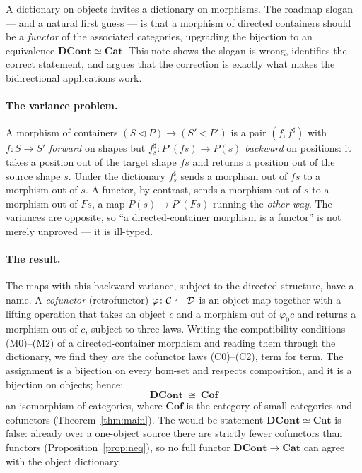 \documentclass[11pt,a4paper]{amsart}
\newcommand{\Cat}{\mathbf{Cat}}
\newcommand{\Cof}{\mathbf{Cof}}
\newcommand{\DCont}{\mathbf{DCont}}
\newcommand{\cont}[2]{#1 \triangleleft #2}
\newcommand{\co}{\mathrel{\text{\reflectbox{$\rightharpoonup$}}}}
\theoremstyle{plain}
\theoremstyle{definition}
\theoremstyle{remark}
\begin{document}
A dictionary on objects invites a dictionary on morphisms. The roadmap slogan --- and a
natural first guess --- is that a morphism of directed containers should be a
\emph{functor} of the associated categories, upgrading the bijection to an equivalence
$\DCont\simeq\Cat$. This note shows the slogan is wrong, identifies the correct
statement, and argues that the correction is exactly what makes the bidirectional
applications work.

\paragraph{The variance problem.} A morphism of containers $(\cont SP)\to(\cont{S'}{P'})$
is a pair $(f,f^\sharp)$ with $f\colon S\to S'$ \emph{forward} on shapes but
$f^\sharp_s\colon P'(fs)\to P(s)$ \emph{backward} on positions: it takes a position out
of the target shape $fs$ and returns a position out of the source shape $s$. Under the
dictionary $f^\sharp_s$ sends a morphism out of $fs$ to a morphism out of $s$. A functor,
by contrast, sends a morphism out of $s$ to a morphism out of $Fs$, a map
$P(s)\to P'(Fs)$ running the \emph{other way}. The variances are opposite, so ``a
directed-container morphism is a functor'' is not merely unproved --- it is ill-typed.

\paragraph{The result.} The maps with this backward variance, subject to the directed
structure, have a name. A \emph{cofunctor} (retrofunctor) \cite{Aguiar,Clarke20}
$\varphi\colon\mathcal C\co\mathcal D$ is an object map together with a lifting operation
that takes an object $c$ and a morphism out of $\varphi_0 c$ and returns a morphism out
of $c$, subject to three laws. Writing the compatibility conditions
(M0)--(M2) of a directed-container morphism and reading them through the dictionary, we
find they \emph{are} the cofunctor laws (C0)--(C2), term for term. The assignment is a
bijection on every hom-set and respects composition, and it is a bijection on objects;
hence:
\[
  \boxed{\ \DCont\ \cong\ \Cof\ }
\]
an isomorphism of categories, where $\Cof$ is the category of small categories and
cofunctors (Theorem~\ref{thm:main}). The would-be statement $\DCont\simeq\Cat$ is false:
already over a one-object source there are strictly fewer cofunctors than functors
(Proposition~\ref{prop:neq}), so no full functor $\DCont\to\Cat$ can agree with the
object dictionary.
\end{document}
